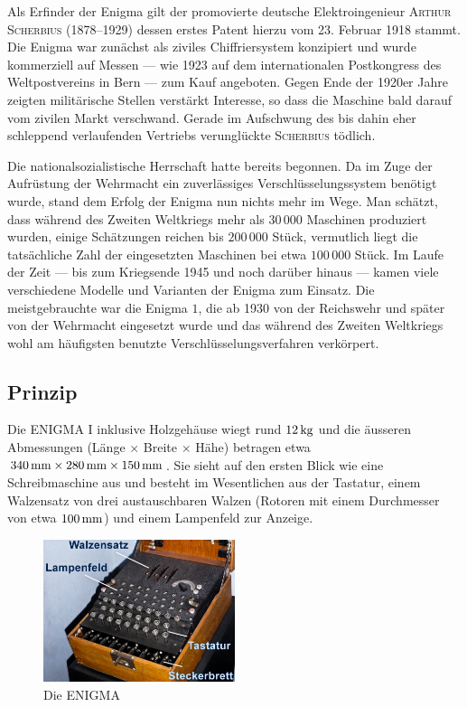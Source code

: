 \documentclass[%
11pt,%
twoside,%
titlepage,%
german,%
headsepline%
]{scrartcl}
\begin{document}
Als Erfinder der Enigma gilt der promovierte deutsche Elektroingenieur \textsc{Arthur Scherbius} (1878--1929) dessen erstes Patent hierzu vom 23. Februar 1918 stammt. Die Enigma war zunächst als ziviles Chiffriersystem konzipiert und wurde kommerziell auf Messen --- wie 1923 auf dem internationalen Postkongress des Weltpostvereins in Bern --- zum Kauf angeboten. Gegen Ende der 1920er Jahre zeigten militärische Stellen verstärkt Interesse, so dass die Maschine bald darauf vom zivilen Markt verschwand. Gerade im Aufschwung des bis dahin eher schleppend verlaufenden Vertriebs verunglückte \textsc{Scherbius} tödlich.

Die nationalsozialistische Herrschaft hatte bereits begonnen. Da im Zuge der Aufrüstung der Wehrmacht ein zuverlässiges Verschlüsselungssystem benötigt wurde, stand dem Erfolg der Enigma nun nichts mehr im Wege.
Man schätzt, dass während des Zweiten Weltkriegs mehr als $30\,000$ Maschinen produziert wurden, einige Schätzungen reichen bis $200\,000$ Stück, vermutlich liegt die tatsächliche Zahl der eingesetzten Maschinen bei etwa $100\,000$ Stück. Im Laufe der Zeit --- bis zum Kriegsende 1945 und noch darüber hinaus --- kamen viele verschiedene Modelle und Varianten der Enigma zum Einsatz. Die meistgebrauchte war die Enigma ${1}$, die ab 1930 von der Reichswehr und später von der Wehrmacht eingesetzt wurde und das während des Zweiten Weltkriegs wohl am häufigsten benutzte Verschlüsselungsverfahren verkörpert.

\subsection{Prinzip}

Die ENIGMA I inklusive Holzgehäuse wiegt rund $\unit[12]{kg}$ und die äusseren Abmessungen (Länge $\times$ Breite $\times$ Hähe) betragen etwa $\unit[340]{mm}\times\unit[280]{mm}\times\unit[150]{mm}$. Sie sieht auf den ersten Blick wie eine Schreibmaschine aus und besteht im Wesentlichen aus der Tastatur, einem Walzensatz von drei austauschbaren Walzen (Rotoren mit einem Durchmesser von etwa $\unit[100]{mm}$) und einem Lampenfeld zur Anzeige.

\begin{figure}
\begin{center}
\includegraphics[width=0.5\textwidth]{pictures/enigma.jpg}
\caption{Die ENIGMA}\label{abb:enigma}
\end{center}
\end{figure}
\end{document}

